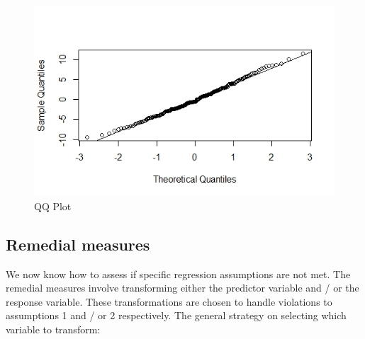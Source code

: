 \documentclass[
]{book}
\begin{document}
\begin{figure}
\centering
\includegraphics{images/qqplot.jpeg}
\caption{\label{fig:qq}QQ Plot}
\end{figure}

\hypertarget{remedial-measures}{%
\subsection{Remedial measures}\label{remedial-measures}}

We now know how to assess if specific regression assumptions are not met. The remedial measures involve transforming either the predictor variable and / or the response variable. These transformations are chosen to handle violations to assumptions 1 and / or 2 respectively. The general strategy on selecting which variable to transform:
\end{document}
